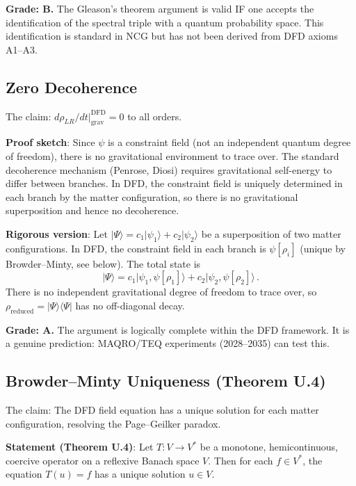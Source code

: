 \documentclass[11pt,a4paper]{article}
\begin{document}
\textbf{Grade: B.} The Gleason's theorem argument is valid IF one accepts the identification of the spectral triple with a quantum probability space. This identification is standard in NCG but has not been derived from DFD axioms A1--A3.

\subsection{Zero Decoherence}

The claim: $d\rho_{LR}/dt|_{\mathrm{grav}}^{\mathrm{DFD}} = 0$ to all orders.

\textbf{Proof sketch}: Since $\psi$ is a constraint field (not an independent quantum degree of freedom), there is no gravitational environment to trace over. The standard decoherence mechanism (Penrose, Diosi) requires gravitational self-energy to differ between branches. In DFD, the constraint field is uniquely determined in each branch by the matter configuration, so there is no gravitational superposition and hence no decoherence.

\textbf{Rigorous version}: Let $|\Psi\rangle = c_1|\psi_1\rangle + c_2|\psi_2\rangle$ be a superposition of two matter configurations. In DFD, the constraint field in each branch is $\psi[\rho_i]$ (unique by Browder--Minty, see below). The total state is
\begin{equation}
|\Psi\rangle = c_1|\psi_1, \psi[\rho_1]\rangle + c_2|\psi_2, \psi[\rho_2]\rangle\,.
\end{equation}
There is no independent gravitational degree of freedom to trace over, so $\rho_{\mathrm{reduced}} = |\Psi\rangle\langle\Psi|$ has no off-diagonal decay.

\textbf{Grade: A.} The argument is logically complete within the DFD framework. It is a genuine prediction: MAQRO/TEQ experiments (2028--2035) can test this.

\subsection{Browder--Minty Uniqueness (Theorem U.4)}

The claim: The DFD field equation has a unique solution for each matter configuration, resolving the Page--Geilker paradox.

\textbf{Statement (Theorem U.4)}: Let $T: V \to V^*$ be a monotone, hemicontinuous, coercive operator on a reflexive Banach space $V$. Then for each $f \in V^*$, the equation $T(u) = f$ has a unique solution $u \in V$.
\end{document}
